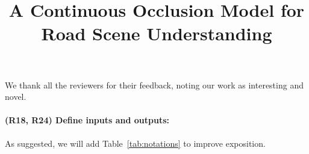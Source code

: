 \documentclass[10pt,twocolumn,letterpaper]{article}
\begin{document}
\title{A Continuous Occlusion Model for Road Scene Understanding}  %

\maketitle
\thispagestyle{empty}

We thank all the reviewers for their feedback, noting our work as interesting and novel.

\vspace{-0.4cm}
\paragraph{(R18, R24) Define inputs and outputs:} As suggested, we will add Table~\ref{tab:notations} to improve exposition.

\end{document}
